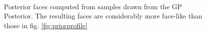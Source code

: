 \begin{figure}[h]
\centering
{}\\
\label{fig:posteriorsample}
\caption{Posterior faces computed from samples drawn from the GP Posterior. The resulting faces are considerably more face-like than those in fig. \ref{fig:priorprofile}}
\end{figure}

